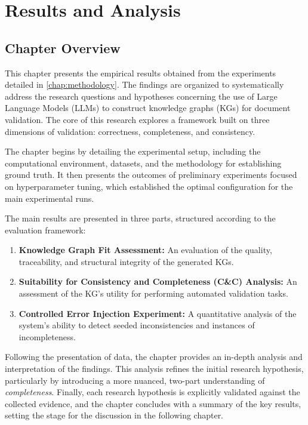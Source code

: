 \chapter{Results and Analysis}
\label{chap:results}

\section{Chapter Overview}
\label{sec:results_overview}

This chapter presents the empirical results obtained from the experiments detailed in \cref{chap:methodology}. The findings are organized to systematically address the research questions and hypotheses concerning the use of Large Language Models (LLMs) to construct knowledge graphs (KGs) for document validation. The core of this research explores a framework built on three dimensions of validation: correctness, completeness, and consistency.

The chapter begins by detailing the experimental setup, including the computational environment, datasets, and the methodology for establishing ground truth. It then presents the outcomes of preliminary experiments focused on hyperparameter tuning, which established the optimal configuration for the main experimental runs.

The main results are presented in three parts, structured according to the evaluation framework:
\begin{enumerate}
    \item \textbf{Knowledge Graph Fit Assessment:} An evaluation of the quality, traceability, and structural integrity of the generated KGs.
    \item \textbf{Suitability for Consistency and Completeness (C\&C) Analysis:} An assessment of the KG's utility for performing automated validation tasks.
    \item \textbf{Controlled Error Injection Experiment:} A quantitative analysis of the system's ability to detect seeded inconsistencies and instances of incompleteness.
\end{enumerate}

Following the presentation of data, the chapter provides an in-depth analysis and interpretation of the findings. This analysis refines the initial research hypothesis, particularly by introducing a more nuanced, two-part understanding of \textit{completeness}. Finally, each research hypothesis is explicitly validated against the collected evidence, and the chapter concludes with a summary of the key results, setting the stage for the discussion in the following chapter.

